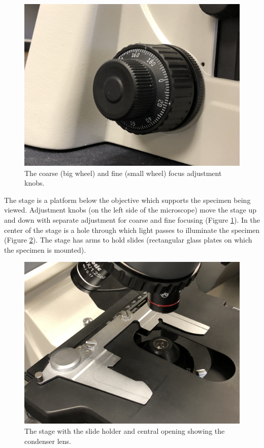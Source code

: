 \begin{figure}

{\centering \includegraphics[width=0.7\linewidth]{./figures/microscope/focus}

}

\caption{The coarse (big wheel) and fine (small wheel) focus adjustment knobs.}\label{fig:focus}
\end{figure}

The stage is a platform below the objective which supports the specimen
being viewed. Adjustment knobs (on the left side of the microscope) move
the stage up and down with separate adjustment for coarse and fine
focusing (Figure \ref{fig:focus}). In the center of the stage is a hole
through which light passes to illuminate the specimen (Figure
\ref{fig:stage}). The stage has arms to hold slides (rectangular glass
plates on which the specimen is mounted).

\begin{figure}

{\centering \includegraphics[width=0.7\linewidth]{./figures/microscope/stage}

}

\caption{The stage with the slide holder and central opening showing the condenser lens.}\label{fig:stage}
\end{figure}

